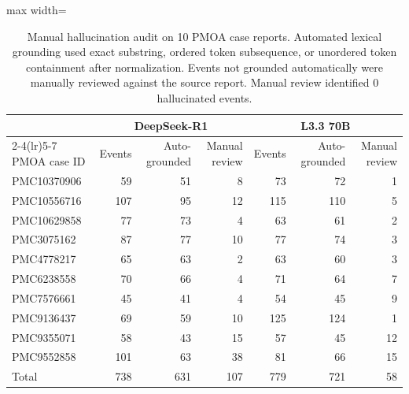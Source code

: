 \begin{table}[htbp]
\caption{Manual hallucination audit on 10 PMOA case reports. Automated lexical grounding used exact substring, ordered token subsequence, or unordered token containment after normalization. Events not grounded automatically were manually reviewed against the source report. Manual review identified 0 hallucinated events.}
\ChSixTableBodyStart
\begin{ChSixFloatBody}

\centering
\small


\begin{adjustbox}{max width=\textwidth}
\begin{tabular}{lrrrrrr}
\toprule
& \multicolumn{3}{c}{DeepSeek-R1} & \multicolumn{3}{c}{L3.3 70B} \\
\cmidrule(lr){2-4}\cmidrule(lr){5-7}
PMOA case ID & Events & Auto-grounded & Manual review & Events & Auto-grounded & Manual review \\
\midrule
PMC10370906 & 59 & 51 & 8 & 73 & 72 & 1 \\
PMC10556716 & 107 & 95 & 12 & 115 & 110 & 5 \\
PMC10629858 & 77 & 73 & 4 & 63 & 61 & 2 \\
PMC3075162 & 87 & 77 & 10 & 77 & 74 & 3 \\
PMC4778217 & 65 & 63 & 2 & 63 & 60 & 3 \\
PMC6238558 & 70 & 66 & 4 & 71 & 64 & 7 \\
PMC7576661 & 45 & 41 & 4 & 54 & 45 & 9 \\
PMC9136437 & 69 & 59 & 10 & 125 & 124 & 1 \\
PMC9355071 & 58 & 43 & 15 & 57 & 45 & 12 \\
PMC9552858 & 101 & 63 & 38 & 81 & 66 & 15 \\
\midrule
Total & 738 & 631 & 107 & 779 & 721 & 58 \\
\bottomrule
\end{tabular}
\end{adjustbox}

\end{ChSixFloatBody}
\end{table}